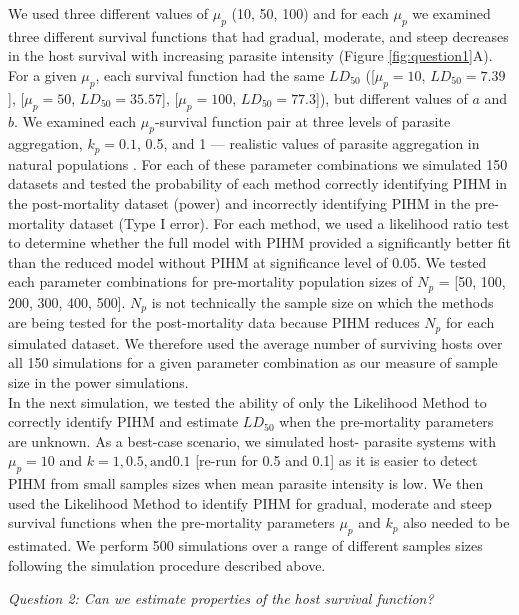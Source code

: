 \documentclass[12pt, a4paper]{article}
\begin{document}
We used three different values of $\mu_p$ (10, 50, 100) and for each $\mu_p$ we examined three different survival functions that had gradual, moderate, and steep decreases in the host survival with increasing parasite intensity (Figure \ref{fig:question1}A).  For a given $\mu_p$, each survival function had the same $LD_{50}$ ([$\mu_p = 10$, $LD_{50} = 7.39$], [$\mu_p = 50$, $LD_{50} = 35.57$], [$\mu_p = 100$, $LD_{50}= 77.3$]),  but different values of $a$ and $b$.  We examined each $\mu_p$-survival function pair at  three levels of parasite
aggregation, $k_p = 0.1$, 0.5, and 1 --- realistic values of parasite aggregation in natural populations \citep{Shaw1998}.  For each of these parameter
combinations we simulated 150 datasets and tested the probability of each method correctly identifying PIHM in the post-mortality dataset (power) and incorrectly identifying PIHM in the pre-mortality dataset (Type I error).  For each method, we used a likelihood ratio test to determine whether the full model with PIHM provided a significantly better fit than the reduced model without PIHM at significance level of 0.05.  We tested each parameter combinations for pre-mortality population sizes of $N_p$ = [50, 100, 200, 300, 400, 500]. $N_p$ is not technically the sample size on which the methods are being
tested for the post-mortality data because PIHM reduces $N_p$ for each simulated
dataset.  We therefore used the average number of surviving hosts over all 150 simulations for a given parameter combination as our measure of sample size in the power simulations.\\

In the next simulation, we tested the ability of only the Likelihood Method to
correctly identify PIHM and estimate $LD_{50}$ when the pre-mortality
parameters are unknown.  As a best-case scenario, we simulated host-
parasite systems with $\mu_p = 10$ and $k = 1, 0.5, \text{and} 0.1$ [re-run for 0.5 and 0.1] as it is easier to detect PIHM from small samples sizes when mean parasite intensity is low. We then used
the Likelihood Method to identify PIHM for gradual, moderate and steep survival
functions when the pre-mortality parameters $\mu_p$ and $k_p$ also needed to be estimated.  We
perform 500 simulations over a range of different samples sizes following the
simulation procedure described above.

\noindent
\emph{Question 2: Can we estimate properties of the host survival function?}
\end{document}
